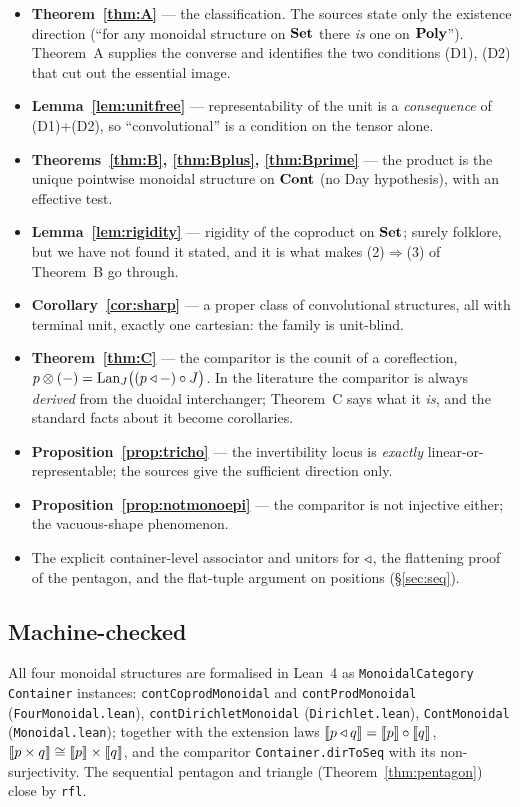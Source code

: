 \begin{itemize}[nosep]
\item \textbf{Theorem~\ref{thm:A}} --- the classification. The sources state only
  the existence direction (``for any monoidal structure on $\mathbf{Set}$ there
  \emph{is} one on $\mathbf{Poly}$''). Theorem~A supplies the converse and identifies
  the two conditions (D1), (D2) that cut out the essential image.
\item \textbf{Lemma~\ref{lem:unitfree}} --- representability of the unit is a
  \emph{consequence} of (D1)+(D2), so ``convolutional'' is a condition on the
  tensor alone.
\item \textbf{Theorems~\ref{thm:B}, \ref{thm:Bplus}, \ref{thm:Bprime}} --- the
  product is the unique pointwise monoidal structure on $\mathbf{Cont}$ (no Day
  hypothesis), with an effective test.
\item \textbf{Lemma~\ref{lem:rigidity}} --- rigidity of the coproduct on $\mathbf{Set}$;
  surely folklore, but we have not found it stated, and it is what makes
  (2)$\Rightarrow$(3) of Theorem~B go through.
\item \textbf{Corollary~\ref{cor:sharp}} --- a proper class of convolutional
  structures, all with terminal unit, exactly one cartesian: the family is
  unit-blind.
\item \textbf{Theorem~\ref{thm:C}} --- the comparitor is the counit of a
  coreflection, $p\mathbin{\otimes}(-)=\mathrm{Lan}_J\bigl((p\mathbin{\triangleleft}-)\circ J\bigr)$. In the literature
  the comparitor is always \emph{derived} from the duoidal interchanger;
  Theorem~C says what it \emph{is}, and the standard facts about it become
  corollaries.
\item \textbf{Proposition~\ref{prop:tricho}} --- the invertibility locus is
  \emph{exactly} linear-or-representable; the sources give the sufficient
  direction only.
\item \textbf{Proposition~\ref{prop:notmonoepi}} --- the comparitor is not
  injective either; the vacuous-shape phenomenon.
\item The explicit container-level associator and unitors for $\mathbin{\triangleleft}$, the
  flattening proof of the pentagon, and the flat-tuple argument on positions
  (§\ref{sec:seq}).
\end{itemize}

\subsection*{Machine-checked}

All four monoidal structures are formalised in Lean~4 as
\texttt{MonoidalCategory Container} instances: \texttt{contCoprodMonoidal} and
\texttt{contProdMonoidal} (\texttt{FourMonoidal.lean}),
\texttt{contDirichletMonoidal} (\texttt{Dirichlet.lean}), \texttt{ContMonoidal}
(\texttt{Monoidal.lean}); together with the extension laws
$\llbracket p\mathbin{\triangleleft} q \rrbracket=\llbracket p \rrbracket\circ\llbracket q \rrbracket$, $\llbracket p\times q \rrbracket\cong\llbracket p \rrbracket\times\llbracket q \rrbracket$, and
the comparitor \texttt{Container.dirToSeq} with its non-surjectivity. The
sequential pentagon and triangle (Theorem~\ref{thm:pentagon}) close by
\texttt{rfl}.

